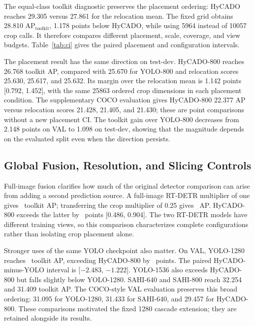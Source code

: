 \documentclass[journal]{IEEEtran}
\newcommand{\APlit}{\mathrm{AP}_{\mathrm{toolkit}}}
\begin{document}
The equal-class toolkit diagnostic preserves the placement ordering: HyCADO reaches 29.305 versus 27.861 for the relocation mean. The fixed grid obtains 28.810 $\APlit$, 1.178 points below HyCADO, while using 5964 instead of 10057 crop calls. It therefore compares different placement, scale, coverage, and view budgets. Table~\ref{tab:ci} gives the paired placement and configuration intervals.

\begin{table}[t]
\caption{Historical VAL toolkit AP differences and marginal 95\% proxy-cluster bootstrap intervals, conditional on the retained models.}
\label{tab:ci}
\centering\small
\end{table}

The placement result has the same direction on test-dev. HyCADO-800 reaches 26.768 toolkit AP, compared with 25.670 for YOLO-800 and relocation scores 25.630, 25.617, and 25.632. Its margin over the relocation mean is 1.142 points [0.792, 1.452], with the same 25863 ordered crop dimensions in each placement condition. The supplementary COCO evaluation gives HyCADO-800 22.377 AP versus relocation scores 21.428, 21.405, and 21.430; these are point comparisons without a new placement CI. The toolkit gain over YOLO-800 decreases from 2.148 points on VAL to 1.098 on test-dev, showing that the magnitude depends on the evaluated split even when the direction persists.

\subsection{Global Fusion, Resolution, and Slicing Controls}
Full-image fusion clarifies how much of the original detector comparison can arise from adding a second prediction source. A full-image RT-DETR multiplier of one gives \APGlobalRaw\ toolkit AP; transferring the crop multiplier of 0.25 gives \APGlobal\ AP. HyCADO-800 exceeds the latter by \GainGlobal\ points [0.486, 0.904]. The two RT-DETR models have different training views, so this comparison characterizes complete configurations rather than isolating crop placement alone.

Stronger uses of the same YOLO checkpoint also matter. On VAL, YOLO-1280 reaches \APYoloHigh\ toolkit AP, exceeding HyCADO-800 by \HighAPLead\ points. The paired HyCADO-minus-YOLO interval is [$-2.483$, $-1.222$]. YOLO-1536 also exceeds HyCADO-800 but falls slightly below YOLO-1280. SAHI-640 and SAHI-800 reach 32.254 and 31.409 toolkit AP. The COCO-style VAL evaluation preserves this broad ordering: 31.095 for YOLO-1280, 31.433 for SAHI-640, and 29.457 for HyCADO-800. These comparisons motivated the fixed 1280 cascade extension; they are retained alongside its results.
\end{document}
